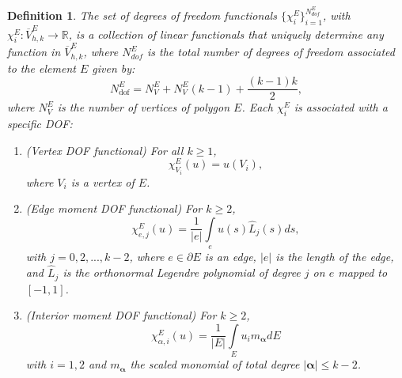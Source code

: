 \documentclass{article}
\newtheorem{defin}{Definition}[section]
\begin{document}
\begin{defin} \label{def:degrees of freedom}
    The set of degrees of freedom functionals $\{ \chi_i^E \}^{N_{dof}^E}_{i=1}$, with $\chi_i^E: \overline{V}^{E}_{h,k}\!\longrightarrow\!\mathbb{R}$, is a collection of linear functionals that uniquely determine any function in $\overline{V}_{h,k}^E$, where $N_{dof}^E$ is the total number of degrees of freedom associated to the element $E$ given by:
    \begin{equation}\label{eq:ndofs}
        N^E_{\text{dof}} = N^E_V + N^E_V (k - 1) + \frac{(k-1)k}{2},
    \end{equation}
    where $N^E_V$ is the number of vertices of polygon $E$. Each $\chi_i^E$ is associated with a specific DOF:
    \begin{enumerate}
        \item (Vertex DOF functional) For all $k \geq 1$,
        \begin{equation}\label{eq:dof_vertex}
            \chi^E_{V_i}(u) = u(V_i),
        \end{equation}
        where $V_i$ is a vertex of $E$.
        \item (Edge moment DOF functional) For $k \geq 2$,
        \begin{equation}\label{eq:dof_edge}
            \chi^E_{e,j} (u) = \frac{1}{|e|} \int \limits_e u(s) \hat{L}_j (s) ds,
        \end{equation}
        with $j=0,2,...,k-2$, where $e \in \partial E$ is an edge, $|e|$ is the length of the edge, and $\hat{L}_j$ is the orthonormal Legendre polynomial of degree $j$ on $e$ mapped to $[-1,1]$.
        \item (Interior moment DOF functional) For $k \geq 2$,
        \begin{equation}\label{eq:dof_moment}
            \chi^E_{\alpha, i}(u) = \frac{1}{|E|} \int \limits_E u_i m_{\boldsymbol\alpha} dE
        \end{equation}
        with $i=1,2$ and $m_{\boldsymbol\alpha}$ the scaled monomial of total degree $|\boldsymbol\alpha|\le k-2$.
    \end{enumerate}
\end{defin}
\end{document}
